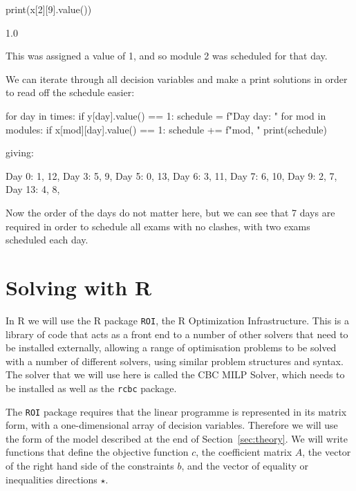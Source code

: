 \begin{pyin}
print(x[2][9].value())
\end{pyin}

\begin{pyout}
1.0
\end{pyout}

This was assigned a value of 1, and so module 2 was scheduled for that day.

We can iterate through all decision variables and make a print solutions in
order to read off the schedule easier:

\begin{pyin}
for day in times:
    if y[day].value() == 1:
        schedule = f"Day {day}: "
        for mod in modules:
            if x[mod][day].value() == 1:
                schedule += f"{mod}, "
        print(schedule)
\end{pyin}

giving:

\begin{pyout}
Day 0: 1, 12, 
Day 3: 5, 9, 
Day 5: 0, 13, 
Day 6: 3, 11, 
Day 7: 6, 10, 
Day 9: 2, 7, 
Day 13: 4, 8,
\end{pyout}

Now the order of the days do not matter here, but we can see that 7 days are
required in order to schedule all exams with no clashes, with two exams
scheduled each day.


\section{Solving with R}\label{sec:solving-with-R}

In R we will use the R package \texttt{ROI}, the R Optimization
Infrastructure.
This is a library of code that acts as a front end to a number of other solvers
that need to be installed externally, allowing a range of optimisation problems
to be solved with a number of different solvers, using similar problem
structures and syntax.
The solver that we will use here is called the CBC MILP Solver, which needs to
be installed as well as the \texttt{rcbc} package.

The \texttt{ROI} package requires that the linear programme is
represented in its matrix form, with a one-dimensional array of decision
variables. Therefore we will use the form of the model described at the end of
Section~\ref{sec:theory}.
We will write functions that define the objective function $c$, the coefficient
matrix $A$, the vector of the right hand side of the constraints $b$, and the
vector of equality or inequalities directions $\star$.

